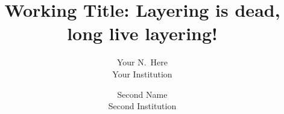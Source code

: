 \documentclass[letterpaper,twocolumn,10pt]{article}
\begin{document}
\date{}

\title{\Large \bf Working Title: Layering is dead, long live layering!}

\author{
{\rm Your N.\ Here}\\
Your Institution
\and
{\rm Second Name}\\
Second Institution
} %

\maketitle

\thispagestyle{empty}










{\footnotesize 
}
\end{document}
